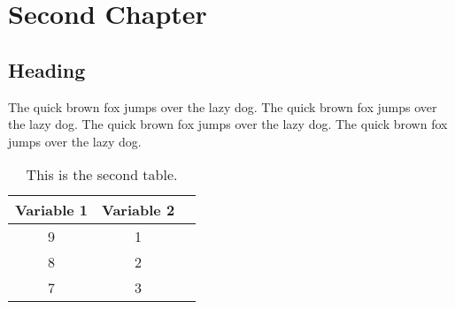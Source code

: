 
\chapter{Second Chapter}

\section{Heading}

The quick brown fox jumps over the lazy dog. 
The quick brown fox jumps over the lazy dog. 
The quick brown fox jumps over the lazy dog. 
The quick brown fox jumps over the lazy dog. 

\begin{table}[!htbp!]%
\caption{This is the second table.}
\label{tabl:2}
\centering
\small
\begin{tabular}{ccc}
\hline
Variable 1 & Variable 2 \\ 
\hline
9 & 1 \\
8 & 2 \\
7 & 3 \\
\hline
\end{tabular}
\end{table}